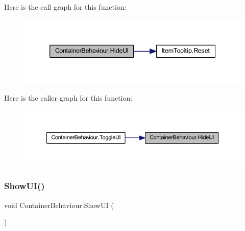 Here is the call graph for this function\+:
\nopagebreak
\begin{figure}[H]
\begin{center}
\leavevmode
\includegraphics[width=339pt]{class_container_behaviour_a0641e9fa2407bee1d83f4998b78f1fa3_cgraph}
\end{center}
\end{figure}
Here is the caller graph for this function\+:
\nopagebreak
\begin{figure}[H]
\begin{center}
\leavevmode
\includegraphics[width=350pt]{class_container_behaviour_a0641e9fa2407bee1d83f4998b78f1fa3_icgraph}
\end{center}
\end{figure}
\mbox{\label{class_container_behaviour_ae4733d72cba5780939349f6d9beeba8f}} 
\subsubsection{\texorpdfstring{ShowUI()}{ShowUI()}}
{\footnotesize\ttfamily void Container\+Behaviour.\+Show\+UI (\begin{DoxyParamCaption}{ }\end{DoxyParamCaption})}

